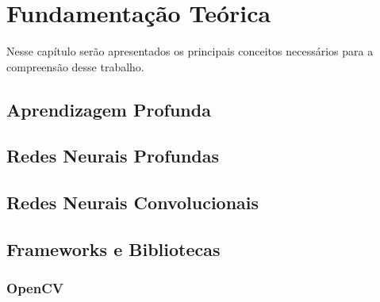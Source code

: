 \chapter{Fundamentação Teórica} \label{cap:fund}
Nesse capítulo serão apresentados os principais conceitos necessários para a compreensão desse trabalho.
    \section{Aprendizagem Profunda} \label{cap:fund-aprendizagem}

    \section{Redes Neurais Profundas} \label{cap:fund-redes_profundas}

    \section{Redes Neurais Convolucionais} \label{cap:fund-redes_convolucionais}
    
    \section{Frameworks e Bibliotecas} \label{cap:fund-frameworks}

        \subsection{OpenCV} \label{cap:fund-frameworks-opencv}

